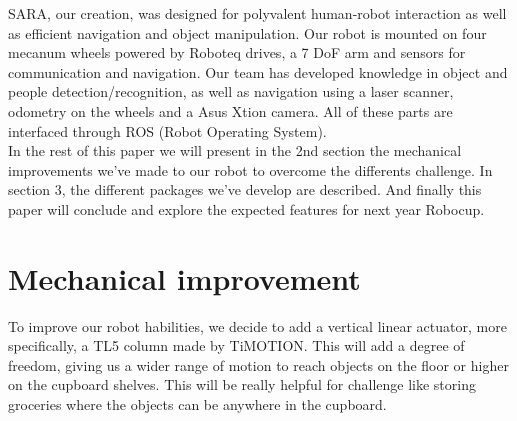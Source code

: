 \documentclass[runningheads,a4paper]{llncs}
\begin{document}
SARA, our creation, was designed for polyvalent human-robot interaction as well as efficient navigation and object manipulation. Our robot is mounted on four mecanum wheels powered by Roboteq drives, a 7 DoF arm and sensors for communication and navigation. Our team has developed knowledge in object and people detection/recognition, as well as navigation using a laser scanner, odometry on the wheels and a Asus Xtion camera. All of these parts are interfaced through ROS (Robot Operating System). \\

In the rest of this paper we will present in the 2nd section the mechanical improvements we've made to our robot to overcome the differents challenge. In section 3, the different packages we've develop are described. And finally this paper will conclude and explore the expected features for next year Robocup.


\section{Mechanical improvement}

\tab To improve our robot habilities, we decide to add a vertical linear actuator, more specifically, a TL5 column made by TiMOTION. This will add a degree of freedom, giving us a wider range of motion to reach objects on the floor or higher on the cupboard shelves. This will be really helpful for challenge like storing groceries where the objects can be anywhere in the cupboard. \\
\end{document}

